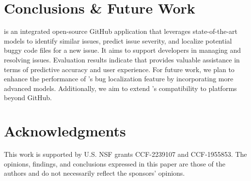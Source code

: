 
\section{Conclusions \& Future Work}
\label{sec:conclusions}

\toolname is an integrated open-source GitHub application that leverages state-of-the-art models to identify similar issues, predict issue severity, and localize potential buggy code files for a new issue. 
It aims to support developers in managing and resolving issues.
Evaluation results indicate that \toolname provides valuable assistance in terms of predictive accuracy and user experience. For future work, we plan to enhance the performance of \toolname's bug localization feature by incorporating more advanced models. Additionally, we aim to extend \toolname’s compatibility to platforms beyond GitHub.

\section*{Acknowledgments}
This work is supported by U.S. NSF grants CCF-2239107 and CCF-1955853. The opinions, findings, and conclusions expressed in this paper are those of the authors and do not necessarily reflect the sponsors' opinions.

